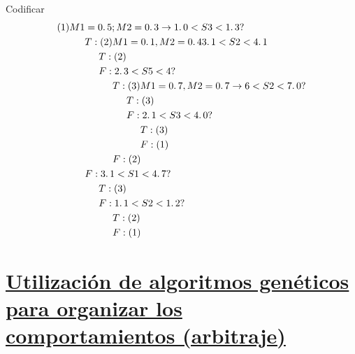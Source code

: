 \begin{ejemplo}
	Codificar 
	\begin{equation}
	\begin{aligned}
		(1) M1 & = 0\ldotp 5; M2 = 0\ldotp3 \rightarrow 1 \ldotp 0 < S3 < 1\ldotp3 ? \\
		& T: (2) M1 = 0\ldotp1, M2 = 0\ldotp4  3\ldotp1 < S2 < 4\ldotp1 \\
		&\hspace{0.5cm} T: (2) \\
		&\hspace{0.5cm} F: 2\ldotp3 < S5 < 4 ? \\
		&\hspace{1cm}T: (3) M1 = 0\ldotp7, M2 = 0\ldotp7 \rightarrow 6 < S2 < 7\ldotp0 ? \\
		& \hspace{1.5cm} T: (3) \\ 
		& \hspace{1.5cm}F: 2\ldotp1 < S3 < 4\ldotp0 ? \\ 
		& \hspace{2cm}T: (3) \\
		& \hspace{2cm}F: (1) \\
		& \hspace{1cm}F: (2) \\ 
		& F: 3\ldotp1 < S1 < 4\ldotp7 ? \\
		& \hspace{0.5cm} T: (3) \\ 
		& \hspace{0.5cm}F: 1\ldotp1 < S2 < 1\ldotp2 ? \\
		& \hspace{1cm}T: (2) \\
		& \hspace{1cm}F: (1) \\ 
	\end{aligned}
	\end{equation}
\end{ejemplo}


\section{\underline{Utilización de algoritmos genéticos para organizar los comportamientos (arbitraje)}}



